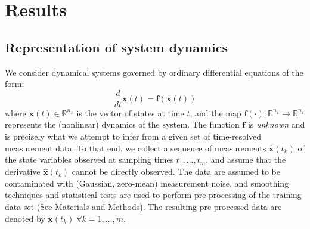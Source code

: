 \documentclass[12pt]{article}
\begin{document}
\section*{Results}

\subsection*{Representation of system dynamics}
We consider dynamical systems governed by ordinary differential equations of the form:
\begin{equation}
\label{eq:dyn_system}
\frac{d}{dt}\textbf{x}(t) = \textbf{f}(\textbf{x}(t))
\end{equation}
where $\textbf{x}(t) \in \mathbb{R}^{n_x}$ is the vector of states at time $t$, and the map $\textbf{f}(\cdot):\mathbb{R}^{n_x}\rightarrow \mathbb{R}^{n_x}$ represents the (nonlinear) dynamics of  the system. The function $\textbf{f}$ is \textit{unknown} and is precisely what we attempt  to infer from a given set of time-resolved measurement data. To that end, we collect a sequence of measurements $\hat{\textbf{x}}(t_k)$ of the state variables observed at sampling times $t_1,\dots,t_m$, and assume that the derivative $\dot{\hat{\textbf{x}}}(t_k)$ cannot be directly observed. The data are assumed to be contaminated with (Gaussian, zero-mean) measurement noise, and smoothing techniques and statistical tests are used to perform pre-processing  of the training data set (See Materials and Methods). The resulting pre-processed data are denoted by $\tilde{\textbf{x}}(t_k) \; \forall k=1,\dots,m$.
\end{document}
